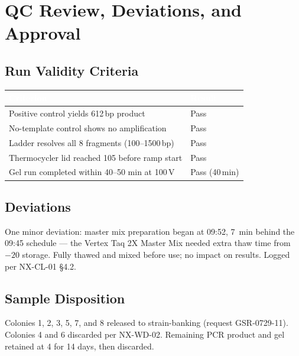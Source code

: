 \section{QC Review, Deviations, and Approval}

\subsection{Run Validity Criteria}

\begin{center}
\footnotesize
\begin{tabularx}{\linewidth}{@{}X l@{}}
\toprule
\rowcolor{pcrteal}
\textcolor{white}{\textbf{Criterion}} & \textcolor{white}{\textbf{Result}} \\
\midrule
Positive control yields 612\,bp product & Pass \\
No-template control shows no amplification & Pass \\
Ladder resolves all 8 fragments (100--1500\,bp) & Pass \\
Thermocycler lid reached 105\degC{} before ramp start & Pass \\
Gel run completed within 40--50 min at 100\,V & Pass (40\,min) \\
\bottomrule
\end{tabularx}
\end{center}

\noindent
\begin{minipage}[t]{0.48\linewidth}
\subsection{Deviations}
\begin{notebox}
\footnotesize
One minor deviation: master mix preparation began at 09:52, 7~min behind the 09:45 schedule ---
the Vertex Taq 2X Master Mix needed extra thaw time from $-20$\degC{} storage. Fully thawed and
mixed before use; no impact on results. Logged per NX-CL-01 \S4.2.
\end{notebox}
\end{minipage}\hfill
\begin{minipage}[t]{0.48\linewidth}
\subsection{Sample Disposition}
\footnotesize
Colonies 1, 2, 3, 5, 7, and 8 released to strain-banking (request GSR-0729-11). Colonies 4 and 6
discarded per NX-WD-02. Remaining PCR product and gel retained at 4\degC{} for 14 days, then
discarded.
\end{minipage}
\par

